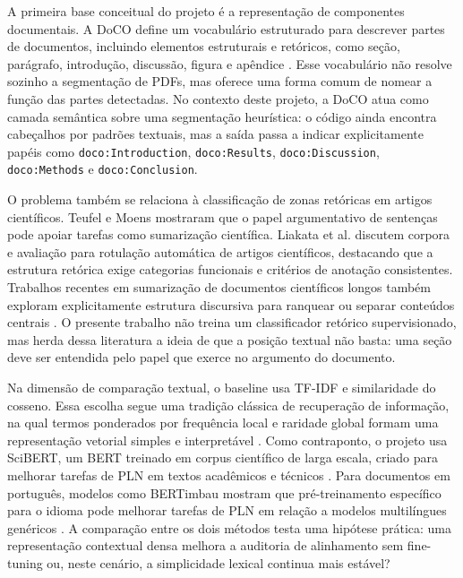 \documentclass[12pt]{article}
\begin{document}
A primeira base conceitual do projeto é a representação de componentes documentais. A DoCO define um vocabulário estruturado para descrever partes de documentos, incluindo elementos estruturais e retóricos, como seção, parágrafo, introdução, discussão, figura e apêndice \cite{constantin2016doco}. Esse vocabulário não resolve sozinho a segmentação de PDFs, mas oferece uma forma comum de nomear a função das partes detectadas. No contexto deste projeto, a DoCO atua como camada semântica sobre uma segmentação heurística: o código ainda encontra cabeçalhos por padrões textuais, mas a saída passa a indicar explicitamente papéis como \texttt{doco:Introduction}, \texttt{doco:Results}, \texttt{doco:Discussion}, \texttt{doco:Methods} e \texttt{doco:Conclusion}.

O problema também se relaciona à classificação de zonas retóricas em artigos científicos. Teufel e Moens \cite{teufel2002summarizing} mostraram que o papel argumentativo de sentenças pode apoiar tarefas como sumarização científica. Liakata et al. \cite{liakata2010corpora} discutem corpora e avaliação para rotulação automática de artigos científicos, destacando que a estrutura retórica exige categorias funcionais e critérios de anotação consistentes. Trabalhos recentes em sumarização de documentos científicos longos também exploram explicitamente estrutura discursiva para ranquear ou separar conteúdos centrais \cite{dong2021discourse,guo2023whatsnew}. O presente trabalho não treina um classificador retórico supervisionado, mas herda dessa literatura a ideia de que a posição textual não basta: uma seção deve ser entendida pelo papel que exerce no argumento do documento.

Na dimensão de comparação textual, o baseline usa TF-IDF e similaridade do cosseno. Essa escolha segue uma tradição clássica de recuperação de informação, na qual termos ponderados por frequência local e raridade global formam uma representação vetorial simples e interpretável \cite{manning2008ir}. Como contraponto, o projeto usa SciBERT, um BERT treinado em corpus científico de larga escala, criado para melhorar tarefas de PLN em textos acadêmicos e técnicos \cite{beltagy2019scibert}. Para documentos em português, modelos como BERTimbau mostram que pré-treinamento específico para o idioma pode melhorar tarefas de PLN em relação a modelos multilíngues genéricos \cite{souza2020bertimbau}. A comparação entre os dois métodos testa uma hipótese prática: uma representação contextual densa melhora a auditoria de alinhamento sem fine-tuning ou, neste cenário, a simplicidade lexical continua mais estável?
\end{document}
